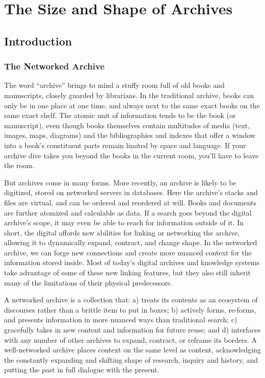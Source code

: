 \chapter{The Size and Shape of Archives}

\section{Introduction}

\subsection{The Networked Archive}

The word “archive” brings to mind a stuffy room full of old books and manuscripts, closely guarded by librarians. In the traditional archive, books can only be in one place at one time, and always next to the same exact books on the same exact shelf. The atomic unit of information tends to be the book (or manuscript), even though books themselves contain multitudes of media (text, images, maps, diagrams) and the bibliographies and indexes that offer a window into a book’s constituent parts remain limited by space and language. If your archive dive takes you beyond the books in the current room, you’ll have to leave the room.

But archives come in many forms. More recently, an archive is likely to be digitized, stored on networked servers in databases. Here the archive’s stacks and files are virtual, and can be ordered and reordered at will. Books and documents are further atomized and calculable as data. If a search goes beyond the digital archive’s scope, it may even be able to reach for information outside of it. In short, the digital affords new abilities for linking or networking the archive, allowing it to dynamically expand, contract, and change shape. In the networked archive, we can forge new connections and create more nuanced context for the information stored inside. Most of today’s digital archives and knowledge systems take advantage of some of these new linking features, but they also still inherit many of the limitations of their physical predecessors.

A networked archive is a collection that: a) treats its contents as an ecosystem of discourses rather than a brittle item to put in boxes; b) actively forms, re-forms, and presents information in more nuanced ways than traditional search; c) gracefully takes in new content and information for future reuse; and d) interfaces with any number of other archives to expand, contract, or reframe its borders. A well-networked archive places context on the same level as content, acknowledging the constantly expanding and shifting shape of research, inquiry and history, and putting the past in full dialogue with the present.

